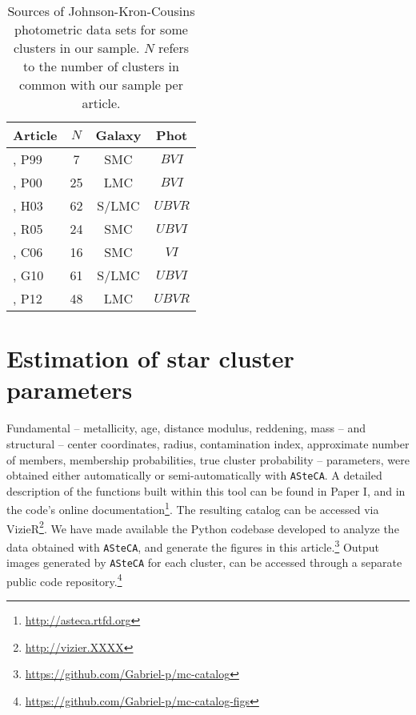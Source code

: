 \documentclass[draft]{aa}
\begin{document}
\begin{table}
\centering
  \caption{Sources of Johnson-Kron-Cousins photometric data sets for some
  clusters in our sample. $N$ refers to the number of clusters in common with
  our sample per article.}
\label{tab:databases}
 \begin{tabular}{l c c c}
\hline\hline
Article & $N$ & Galaxy & Phot\\
\hline
\cite{Pietrzynski1999}, P99 & 7 & SMC & $BVI$ \\ 
\cite{Pietrzynski2000}, P00 & 25 & LMC & $BVI$ \\ 
\cite{Hunter_2003}, H03 & 62 & S/LMC & $UBVR$ \\ 
\cite{Rafelski_2005}, R05 & 24 & SMC & $UBVI$ \\ 
\cite{Chiosi_2006}, C06 & 16 & SMC & $VI$ \\ 
\cite{Glatt_2010}, G10 & 61 & S/LMC & $UBVI$ \\ 
\cite{Popescu_2012}, P12 & 48 & LMC & $UBVR$ \\ 
\hline
 \end{tabular} 
\end{table}
  




\section{Estimation of star cluster parameters}
\label{sec:fund-params}

Fundamental -- metallicity, age, distance modulus, reddening, mass -- and
structural -- center coordinates, radius, contamination index, approximate
number of members, membership probabilities, true cluster probability --
parameters, were obtained either automatically or semi-automatically with
\texttt{ASteCA}.
%
A detailed description of the functions built within this tool can be found in
Paper I, and in the code's online
documentation\footnote{\url{http://asteca.rtfd.org}}.
%
The resulting catalog can be accessed via
VizieR\footnote{\url{http://vizier.XXXX}}.
We have made available the Python codebase developed to analyze
the data obtained with \texttt{ASteCA}, and generate the figures in this
article.\footnote{\url{https://github.com/Gabriel-p/mc-catalog}}
%
Output images generated by \texttt{ASteCA} for each cluster, can be
accessed through a separate public code
repository.\footnote{\url{https://github.com/Gabriel-p/mc-catalog-figs}}
\end{document}
